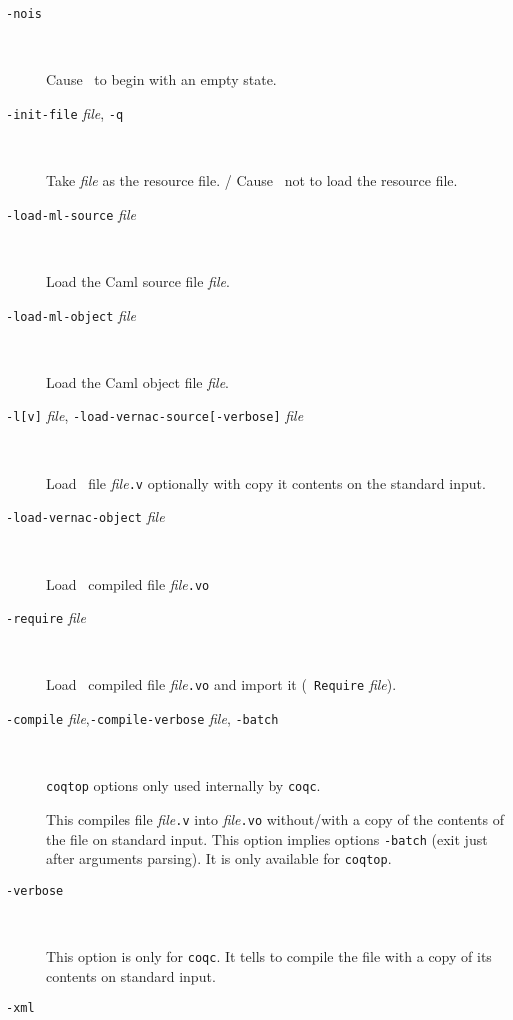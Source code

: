 \begin{description}
\item[{\tt -nois}]\ 

  Cause \Coq~to begin with an empty state.

\item[{\tt -init-file} {\em file}, {\tt -q}]\ 

  Take {\em file} as the resource file. /
  Cause \Coq~not to load the resource file.

\item[{\tt -load-ml-source} {\em file}]\ 

  Load the Caml source file {\em file}.

\item[{\tt -load-ml-object} {\em file}]\ 

  Load the Caml object file {\em file}.

\item[{\tt -l[v]} {\em file}, {\tt -load-vernac-source[-verbose]} {\em file}]\ 

  Load \Coq~file {\em file}{\tt .v} optionally with copy it contents on the
  standard input.

\item[{\tt -load-vernac-object} {\em file}]\ 

  Load \Coq~compiled file {\em file}{\tt .vo}

\item[{\tt -require} {\em file}]\ 

  Load \Coq~compiled file {\em file}{\tt .vo} and import it ({\tt
    Require} {\em file}).

\item[{\tt -compile} {\em file},{\tt -compile-verbose} {\em file}, {\tt -batch}]\ 

  {\tt coqtop} options only used internally by {\tt coqc}.

  This compiles file {\em file}{\tt .v} into {\em file}{\tt .vo} without/with a
  copy of the contents of the file on standard input.  This option implies options
  {\tt -batch} (exit just after arguments parsing). It is only
  available for {\tt coqtop}.

\item[{\tt -verbose}]\ 

  This option is only for {\tt coqc}. It tells to compile the file with
  a copy of its contents on standard input.

%

\item[{\tt -xml}]\ 


\end{description}
